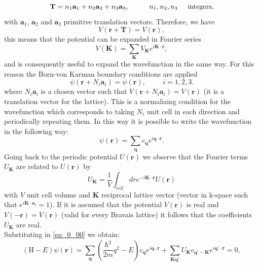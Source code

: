 \begin{equation}
    \mathbf{T}=n_1\mathbf{a}_1+n_2\mathbf{a}_2+n_3\mathbf{a}_3,\hspace{1cm}n_1,n_2,n_3\hspace{0.5cm}\mathrm{integers},
\end{equation}
with $\mathbf{a}_1$, $\mathbf{a}_2$ and $\mathbf{a}_3$ primitive translation vectors.
Therefore, we have
\begin{equation}
    V(\mathbf{r}+\mathbf{T})=V(\mathbf{r}),
\end{equation}
this means that the potential can be expanded in Fourier series
\begin{equation}
    V(\mathbf{K})=\sum_\mathbf{K}V_\mathbf{K}e^{i\mathbf{K}\cdot \mathbf{r}},
\end{equation}
and is consequently useful to expand the wavefunction in the same way. For this reason the Born-von Karman boundary conditions
are applied \cite{Ashcroft76}
\begin{equation}
    \psi(\mathbf{r}+N_i\mathbf{a}_i)=\psi(\mathbf{r}),\hspace{1cm}i=1,2,3.
\end{equation}
where $N_i\mathbf{a}_i$ is a chosen vector such that $V(\mathbf{r}+N_i\mathbf{a}_i)=V(\mathbf{r})$ (it is a translation vector for the lattice). This is a normalizing
condition for the wavefunction which corresponds to taking $N_i$ unit cell in each direction and periodically repeating them. In this 
way it is possible to write the wavefunction in the following way:
\begin{equation}
    \psi(\mathbf{r})=\sum_\mathbf{q}c_\mathbf{q}e^{i\mathbf{q}\cdot\mathbf{r}}.
    \label{eq_0_01}
\end{equation}
Going back to the periodic potential $U(\mathbf{r})$ we observe that the Fourier terms $U_\mathbf{K}$ are related to $U(\mathbf{r})$ by
\begin{equation}
    U_\mathbf{K}=\frac{1}{V}\int_{cell}dre^{-i\mathbf{K}\cdot\mathbf{r}}U(\mathbf{r})
\end{equation}
with $V$ unit cell volume and $\mathbf{K}$ reciprocal lattice vector (vector in k-space such that $e^{i\mathbf{K}\cdot \mathbf{a}_i}=1$). If it is 
assumed that the potential $V(\mathbf{r})$ is real and $V(-\mathbf{r})=V(\mathbf{r})$ (valid for every Bravais lattice) it follows that the coefficients 
$U_\mathbf{K}$ are real.\\
Substituting in \ref{eq_0_00} we obtain:
\begin{equation}
    (\mathrm{H}-E)\psi(\mathbf{r})=\sum_\mathbf{q}\left(\frac{\hbar^2}{2m}q^2-E\right)c_\mathbf{q}e^{i\mathbf{q}\cdot\mathbf{r}}+\sum_{\mathbf{K}\mathbf{q}'}U_\mathbf{K}c_{\mathbf{q}'-\mathbf{K}}e^{i\mathbf{q}'\cdot\mathbf{r}}=0,
\end{equation}

